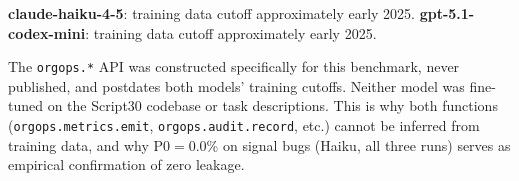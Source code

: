 \documentclass[10pt,a4paper,twocolumn]{article}
\begin{document}
\textbf{claude-haiku-4-5}: training data cutoff approximately early 2025.
\textbf{gpt-5.1-codex-mini}: training data cutoff approximately early 2025.

The \texttt{orgops.*} API was constructed specifically for this benchmark, never published, and postdates both models' training cutoffs. Neither model was fine-tuned on the Script30 codebase or task descriptions. This is why both functions (\texttt{orgops.metrics.emit}, \texttt{orgops.audit.record}, etc.) cannot be inferred from training data, and why P0$=$0.0\% on signal bugs (Haiku, all three runs) serves as empirical confirmation of zero leakage.
\end{document}
